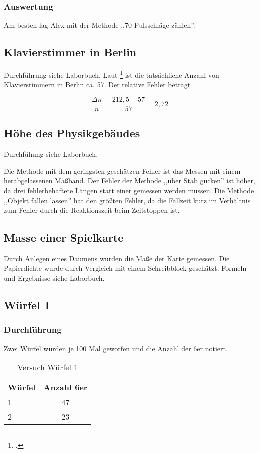 \subsubsection{Auswertung}
Am besten lag Alex mit der Methode ,,70 Pulsschläge zählen''.

\subsection{Klavierstimmer in Berlin}
Durchführung siehe Laborbuch.
Laut \footcite{gelbeseiten} ist die tatsächliche Anzahl von Klavierstimmern in Berlin ca. 57. Der relative Fehler beträgt

\begin{equation}
  \frac{\Delta n}{n}=\frac{212,5-57}{57}=2,72
  \label{klavierfehler}
\end{equation}

\subsection{Höhe des Physikgebäudes}

Durchfühung siehe Laborbuch.

Die Methode mit dem geringsten geschätzen Fehler ist das Messen mit einem herabgelassenen Maßband. Der Fehler der Methode ,,über Stab gucken'' ist höher, da drei fehlerbehaftete Längen statt einer gemessen werden müssen. Die Methode ,,Objekt fallen lassen'' hat den größten Fehler, da die Fallzeit kurz im Verhältnis zum Fehler durch die Reaktionszeit beim Zeitstoppen ist.

\subsection{Masse einer Spielkarte}

Durch Anlegen eines Daumens wurden die Maße der Karte gemessen. Die Papierdichte wurde durch Vergleich mit einem Schreibblock geschätzt.
Formeln und Ergebnisse siehe Laborbuch.

\subsection{Würfel 1}
\subsubsection{Durchführung}
Zwei Würfel wurden je 100 Mal geworfen und die Anzahl der 6er notiert.

\begin{table}[h]
  \centering
  \begin{tabular}{l | c}
    Würfel & Anzahl 6er \\ \hline
    1 & 47 \\
    2 & 23
  \end{tabular}
  \caption{Versuch Würfel 1}
  \label{tab:wuerfel1}
\end{table}

